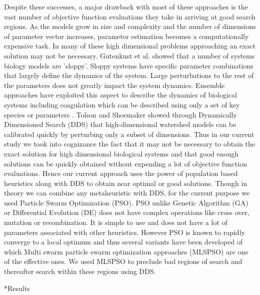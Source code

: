 \documentclass[12pt]{article}
\makeatletter
\renewcommand\section{\@startsection
	{subsection}{2}{0mm}
	{-0.2in}
	{0.05\baselineskip}
	{\normalfont\large\bfseries}}
\makeatother
\begin{document}
Despite these successes, a  major drawback with most of these approaches is the vast number of objective function evaluations they take in arriving at good search regions. As the models grow in size and complexity and the number of dimensions of parameter vector increases,  parameter estimation becomes a computationally expensive task. In many of these high dimensional problems approaching an exact solution may not be necessary. Gutenkust et al. \cite{gutenkunst2007universally} showed that a number of systems biology models are 'sloppy'. Sloppy systems have specific parameter combinations that largely define the dynamics of the system. Large perturbations to the rest of the parameters does not greatly impact the system dynamics. Ensemble approaches \cite{song2010ensembles,luan2010ensembles} have exploited this aspect to describe the dynamics of biological systems including coagulation which can be described using only a set of key species or parameters \cite{sagar2015dynamic}. Tolson and Shoemaker \cite{tolson2007dynamically} showed through Dynamically Dimensioned Search (DDS) that high-dimensional watershed models can be calibrated quickly by perturbing only a subset of dimensions. Thus in our current study we took into cognizance the fact that it may not be necessary to obtain the exact solution for high dimensional biological systems and that good enough solutions can be quickly obtained without expending a lot of objective function evaluations. Hence our current approach uses the power of population based heuristics along with DDS to obtain near optimal or good solutions. Though in theory we can combine any metaheuristic with DDS, for the current purpose we used Particle Swarm Optimization (PSO). PSO unlike Genetic Algorithm (GA) or Differential Evolution (DE) does not have complex operations like cross over, mutation or recombination. It is simple to use and does not have a lot of parameters associated with other heuristics. However PSO is known to rapidly converge to a local optimum and thus several variants \cite{peer2003using,zhan2009adaptive,li2007fast} have been developed of which Multi swarm particle swarm optimization approaches (MLSPSO) \cite{zhao2008dynamic,liang2005dynamic} are one of the effective ones. We used MLSPSO to preclude bad regions of search and thereafter search within these regions using DDS. 


 \clearpage

\section*{Results}
\end{document}
